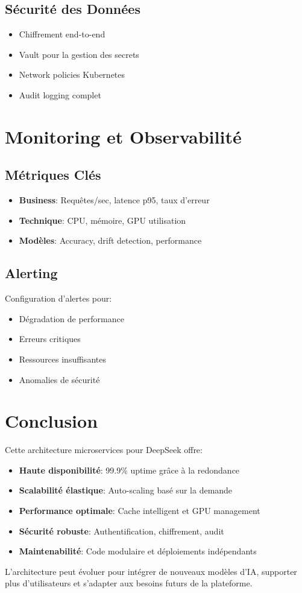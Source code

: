 \documentclass[12pt,a4paper]{article}
\begin{document}
\subsection{Sécurité des Données}
\begin{itemize}
    \item Chiffrement end-to-end
    \item Vault pour la gestion des secrets
    \item Network policies Kubernetes
    \item Audit logging complet
\end{itemize}

\section{Monitoring et Observabilité}

\subsection{Métriques Clés}
\begin{itemize}
    \item \textbf{Business}: Requêtes/sec, latence p95, taux d'erreur
    \item \textbf{Technique}: CPU, mémoire, GPU utilisation
    \item \textbf{Modèles}: Accuracy, drift detection, performance
\end{itemize}

\subsection{Alerting}
Configuration d'alertes pour:
\begin{itemize}
    \item Dégradation de performance
    \item Erreurs critiques
    \item Ressources insuffisantes
    \item Anomalies de sécurité
\end{itemize}

\section{Conclusion}

Cette architecture microservices pour DeepSeek offre:

\begin{itemize}
    \item \textbf{Haute disponibilité}: 99.9\% uptime grâce à la redondance
    \item \textbf{Scalabilité élastique}: Auto-scaling basé sur la demande
    \item \textbf{Performance optimale}: Cache intelligent et GPU management
    \item \textbf{Sécurité robuste}: Authentification, chiffrement, audit
    \item \textbf{Maintenabilité}: Code modulaire et déploiements indépendants
\end{itemize}

L'architecture peut évoluer pour intégrer de nouveaux modèles d'IA, supporter plus d'utilisateurs et s'adapter aux besoins futurs de la plateforme.
\end{document}
